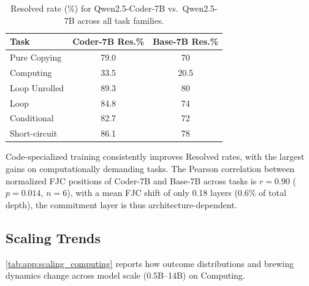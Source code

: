 \begin{table}[H]
\centering
\caption{Resolved rate (\%) for Qwen2.5-Coder-7B vs.\ Qwen2.5-7B across
all task families.}
\label{tab:app:coder_vs_base_all_tasks}
\begin{tabular}{lcc}
\toprule
Task & Coder-7B Res.\% & Base-7B Res.\% \\
\midrule
Pure Copying     & 79.0 & 70 \\
Computing        & 33.5 & 20.5 \\
Loop Unrolled    & 89.3 & 80 \\
Loop             & 84.8 & 74 \\
Conditional      & 82.7 & 72 \\
Short-circuit    & 86.1 & 78 \\
\bottomrule
\end{tabular}
\end{table}

Code-specialized training consistently improves Resolved rates, with the largest gains on computationally demanding tasks.
The Pearson correlation between normalized FJC positions of Coder-7B and Base-7B across tasks is $r = 0.90$ ($p = 0.014$, $n{=}6$), with a mean FJC shift of only 0.18 layers (0.6\% of total depth), the commitment layer is thus architecture-dependent.


\subsection{Scaling Trends}
\label{app:subsec:scaling_trends}

\cref{tab:app:scaling_computing} reports how outcome distributions and brewing dynamics change across model scale (0.5B--14B) on Computing.

\begin{table}[H]
\centering
\caption{Scaling trends on Computing for Qwen2.5-Coder (0.5B--14B).
$L$ denotes the number of transformer layers; norm.\ $\Delta_{\mathrm{brew}}$
is the brewing duration normalized by total depth.}
\label{tab:app:scaling_computing}
\end{table}

